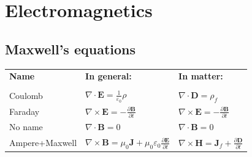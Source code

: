 \documentclass[letterpaper,landscape,10pt]{article}
\newenvironment{mydescription}
{\begin{description}
	\setlength{\itemsep}{0pt}
	\setlength{\parskip}{0pt}
	\setlength{\parsep}{-1pt}}
{\end{description}}
\begin{document}
{\begin{multicols}{4}
\begin{mydescription}
\end{mydescription}
   

\section*{Electromagnetics}
	\subsection*{Maxwell's equations}
    	\begin{tabular}{l l l}
			\textbf{Name} & \textbf{In general:} & \textbf{In matter:} \\
			[3pt] \\
			Coulomb & $\nabla\cdot\bm{E}=\frac{1}{\varepsilon_0}\rho$  & $\nabla\cdot\bm{D}=\rho_f$ \\
    		[3pt]
			Faraday & $\nabla\times\bm{E}=-\frac{\partial \bm{B}}{\partial t}$ & $\nabla\times\bm{E}=-\frac{\partial \bm{B}}{\partial t}$ \\
    		[3pt]
			No name & $\nabla\cdot\bm{B}=0$  & $\nabla\cdot\bm{B}=0$ \\
    		[3pt]
			Ampere+Maxwell & $\nabla\times\bm{B} = \mu_0\bm{J} + \mu_0\varepsilon_0\frac{\partial \bm{E}}{\partial t}$ & $\nabla\times\bm{H} = \bm{J}_f + \frac{\partial \bm{D}}{\partial t}$
 		\end{tabular}


\end{multicols}}
\end{document}
